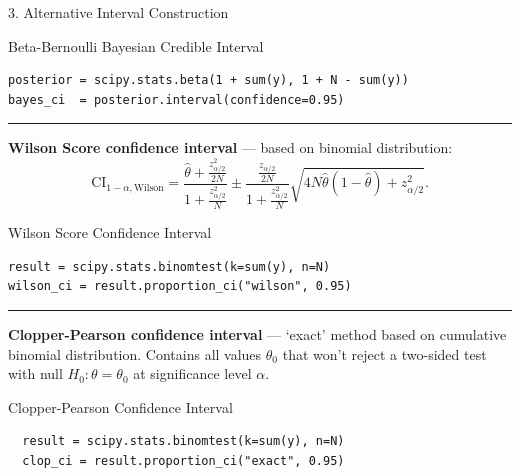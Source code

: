 \documentclass[final]{beamer}
\newlength{\colwidth}
\begin{document}
\begin{frame}[fragile]
\begin{columns}[t]
\begin{column}{\colwidth}
\begin{block}{3. Alternative Interval Construction}
    \begin{pbox}[label={ex:bayes_simple}]{Beta-Bernoulli Bayesian Credible Interval}
    \begin{verbatim}
posterior = scipy.stats.beta(1 + sum(y), 1 + N - sum(y))
bayes_ci  = posterior.interval(confidence=0.95)
    \end{verbatim}
    \end{pbox}

    \vspace{-1.25em}
    \begin{center}
      \rule{0.8\textwidth}{0.4pt}
    \end{center}

    \textbf{Wilson Score confidence interval} --- based on binomial distribution:
    $$
    \text{CI}_{1-\alpha, \text{Wilson}} = \frac{\hat{\theta} + \frac{z_{\alpha/2}^2}{2N}}{1 + \frac{z_{\alpha/2}^2}{N}} \pm \frac{\frac{z_{\alpha/2}}{2N}}{1 + \frac{z_{\alpha/2}^2}{N}}\sqrt{4N\hat{\theta}(1 - \hat{\theta}) + z_{\alpha/2}^2}.
    $$

    \begin{pbox}[label={ex:wilson_simple}]{Wilson Score Confidence Interval}
    \begin{verbatim}
result = scipy.stats.binomtest(k=sum(y), n=N)
wilson_ci = result.proportion_ci("wilson", 0.95)
    \end{verbatim}
    \end{pbox}

    \vspace{-1.25em}
    \begin{center}
      \rule{0.8\textwidth}{0.4pt}
    \end{center}

    \textbf{Clopper-Pearson confidence interval} --- `exact' method based on cumulative binomial distribution.
    Contains all values $\theta_0$ that won't reject a two-sided test with null $H_0: \theta = \theta_0$ at significance level $\alpha$.

    \begin{pbox}[label={ex:clopper_simple}]{Clopper-Pearson Confidence Interval}
      \begin{verbatim}
  result = scipy.stats.binomtest(k=sum(y), n=N)
  clop_ci = result.proportion_ci("exact", 0.95)
      \end{verbatim}
      \end{pbox}


\end{block}
\end{column}
\end{columns}
\end{frame}
\end{document}
